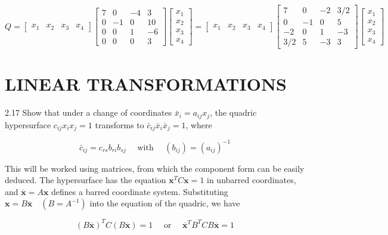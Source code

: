 \documentclass[10pt]{article}
\begin{document}
$$
Q=\left[\begin{array}{llll}
x_{1} & x_{2} & x_{3} & x_{4}
\end{array}\right]\left[\begin{array}{rrrr}
7 & 0 & -4 & 3 \\
0 & -1 & 0 & 10 \\
0 & 0 & 1 & -6 \\
0 & 0 & 0 & 3
\end{array}\right]\left[\begin{array}{l}
x_{1} \\
x_{2} \\
x_{3} \\
x_{4}
\end{array}\right]=\left[\begin{array}{llll}
x_{1} & x_{2} & x_{3} & x_{4}
\end{array}\right]\left[\begin{array}{rrrr}
7 & 0 & -2 & 3 / 2 \\
0 & -1 & 0 & 5 \\
-2 & 0 & 1 & -3 \\
3 / 2 & 5 & -3 & 3
\end{array}\right]\left[\begin{array}{l}
x_{1} \\
x_{2} \\
x_{3} \\
x_{4}
\end{array}\right]
$$

\section*{LINEAR TRANSFORMATIONS}
2.17 Show that under a change of coordinates $\bar{x}_{i}=a_{i j} x_{j}$, the quadric hypersurface $c_{i j} x_{i} x_{j}=1$ transforms to $\bar{c}_{i j} \bar{x}_{i} \bar{x}_{j}=1$, where

$$
\bar{c}_{i j}=c_{r s} b_{r i} b_{s j} \quad \text { with } \quad\left(b_{i j}\right)=\left(a_{i j}\right)^{-1}
$$

This will be worked using matrices, from which the component form can be easily deduced. The hypersurface has the equation $\mathbf{x}^{T} C \mathbf{x}=1$ in unbarred coordinates, and $\overline{\mathbf{x}}=A \mathbf{x}$ defines a barred coordinate system. Substituting $\mathbf{x}=B \overline{\mathbf{x}} \quad\left(B=A^{-1}\right)$ into the equation of the quadric, we have

$$
(B \overline{\mathbf{x}})^{T} C(B \overline{\mathbf{x}})=1 \quad \text { or } \quad \overline{\mathbf{x}}^{T} B^{T} C B \overline{\mathbf{x}}=1
$$
\end{document}
